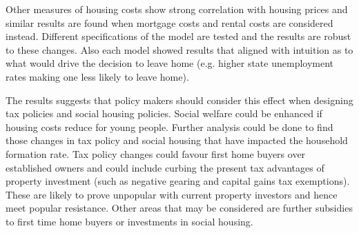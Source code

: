 \documentclass[12pt]{article}
\begin{document}
Other measures of housing costs show strong correlation with housing prices and similar results are found when mortgage costs and rental costs are considered instead. Different specifications of the model are tested and the results are robust to these changes. Also each model showed results that aligned with intuition as to what would drive the decision to leave home (e.g. higher state unemployment rates making one less likely to leave home).

The results suggests that policy makers should consider this effect when designing tax policies and social housing policies. Social welfare could be enhanced if housing costs reduce for young people. Further analysis could be done to find those changes in tax policy and social housing that have impacted the household formation rate. Tax policy changes could favour first home buyers over established owners and could include curbing the present tax advantages of property investment (such as negative gearing and capital gains tax exemptions). These are likely to prove unpopular with current property investors and hence meet popular resistance. Other areas that may be considered are further subsidies to first time home buyers or investments in social housing.

\printbibliography{}  %
\end{document}
